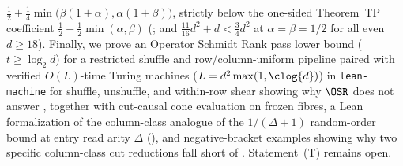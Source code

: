 $\frac{1}{2} + \frac{1}{4}\min\bigl(\beta(1+\alpha), \alpha(1+\beta)\bigr)$, strictly below the
one-sided Theorem~TP coefficient $\frac{1}{2} + \frac{1}{2}\min(\alpha, \beta)$
(\cite[Theorem~6.4]{SeventeenthPaper2026}; and $\frac{11}{16}d^2 + d < \frac{3}{4}d^2$ at
$\alpha = \beta = 1/2$ for all even $d \ge 18$). Finally, we prove an Operator Schmidt Rank pass
lower bound ($t \ge \log_2 d$) for a restricted shuffle and row/column-uniform pipeline paired with
verified $O(L)$-time Turing machines ($L = d^2\max(1,\clog{d})$) in \texttt{lean-machine} for shuffle,
unshuffle, and within-row shear showing why $\OSR$ does not answer
\cite[Problem~9.5]{SeventeenthPaper2026}, together with cut-causal cone evaluation on frozen
 fibres, a Lean formalization of the column-class analogue of the
$1/(\Delta+1)$ random-order bound at entry read arity $\Delta$
(\cite[Proposition~4.14(a)--(b)]{FourthPaper2026}), and negative-bracket examples showing why two
specific column-class cut reductions fall short of \cite[Problem~9.4(b)]{SeventeenthPaper2026}.
Statement~(T) remains open.
